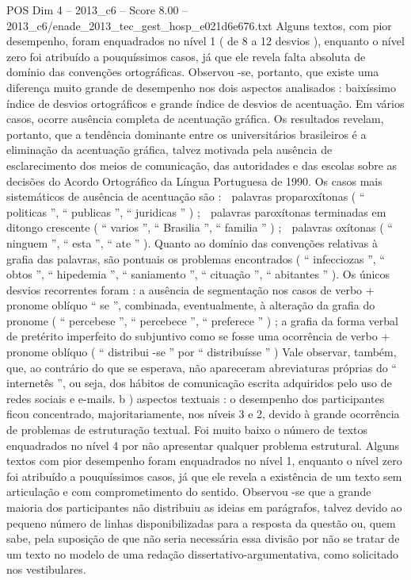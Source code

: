 \begin{textsample}{POS Dim 4 – 2013\_c6 – Score 8.00 – 2013\_c6/enade\_2013\_tec\_gest\_hosp\_e021d6e676.txt}
Alguns textos, com pior desempenho, foram enquadrados no nível 1 ( de 8 a 12 desvios ), enquanto o nível zero foi atribuído a pouquíssimos casos, já que ele revela falta absoluta de domínio das convenções ortográficas.
Observou -se, portanto, que existe uma diferença muito grande de desempenho nos dois aspectos analisados : baixíssimo índice de desvios ortográficos e grande índice de desvios de acentuação.
Em vários casos, ocorre ausência completa de acentuação gráfica.
Os resultados revelam, portanto, que a tendência dominante entre os universitários brasileiros é a eliminação da acentuação gráfica, talvez motivada pela ausência de esclarecimento dos meios de comunicação, das autoridades e das escolas sobre as decisões do Acordo Ortográfico da Língua Portuguesa de 1990.
Os casos mais sistemáticos de ausência de acentuação são :  palavras proparoxítonas ( “ politicas ”, “ publicas ”, “ juridicas ” ) ;  palavras paroxítonas terminadas em ditongo crescente ( “ varios ”, “ Brasilia ”, “ familia ” ) ;  palavras oxítonas ( “ ninguem ”, “ esta ”, “ ate ” ).
Quanto ao domínio das convenções relativas à grafia das palavras, são pontuais os problemas encontrados ( “ infecciozas ”, “ obtos ”, “ hipedemia ”, “ saniamento ”, “ cituação ”, “ abitantes ” ).
Os únicos desvios recorrentes foram : a ausência de segmentação nos casos de verbo + pronome oblíquo “ se ”, combinada, eventualmente, à alteração da grafia do pronome ( “ percebese ”, “ percebece ”, “ preferece ” ) ; a grafia da forma verbal de pretérito imperfeito do subjuntivo como se fosse uma ocorrência de verbo + pronome oblíquo ( “ distribui -se ” por “ distribuísse ” ) Vale observar, também, que, ao contrário do que se esperava, não apareceram abreviaturas próprias do “ internetês ”, ou seja, dos hábitos de comunicação escrita adquiridos pelo uso de redes sociais e e-mails. b ) aspectos textuais : o desempenho dos participantes ficou concentrado, majoritariamente, nos níveis 3 e 2, devido à grande ocorrência de problemas de estruturação textual.
Foi muito baixo o número de textos enquadrados no nível 4 por não apresentar qualquer problema estrutural.
Alguns textos com pior desempenho foram enquadrados no nível 1, enquanto o nível zero foi atribuído a pouquíssimos casos, já que ele revela a existência de um texto sem articulação e com comprometimento do sentido.
Observou -se que a grande maioria dos participantes não distribuiu as ideias em parágrafos, talvez devido ao pequeno número de linhas disponibilizadas para a resposta da questão ou, quem sabe, pela suposição de que não seria necessária essa divisão por não se tratar de um texto no modelo de uma redação dissertativo-argumentativa, como solicitado nos vestibulares.

\end{textsample}
